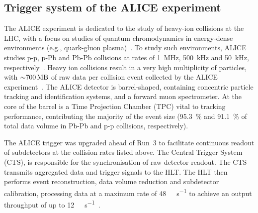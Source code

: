 \subsection{Trigger system of the ALICE experiment}
The ALICE experiment is dedicated to the study of heavy-ion collisions at the LHC, with a focus on studies of quantum chromodynamics in energy-dense environments (e.g.,  quark-gluon plasma)~\cite{alice-performance-paper-run1}. To study such environments, ALICE studies p-p, p-Pb and Pb-Pb collisions at rates of \SI{1}{\mega\hertz}, \SI{500}{\kilo\hertz} and \SI{50}{\kilo\hertz}, respectively~\cite{alice-trigger-run3}. Heavy ion collisions result in a very high multiplicity of particles, with ${\sim}\SI{700}{\mega\byte}$ of raw data per collision event collected by the ALICE experiment~\cite{alice-rta-trigger}. The ALICE detector is barrel-shaped, containing concentric particle tracking and identification systems, and a forward muon spectrometer. At the core of the barrel is a Time Projection Chamber (TPC) vital to tracking performance, contributing the majority of the event size (\SI{95.3}{\percent} and \SI{91.1}{\percent} of total data volume in Pb-Pb and p-p collisions, respectively).

The ALICE trigger was upgraded ahead of Run~3 to facilitate continuous readout of subdetectors at the collision rates listed above. The Central Trigger System (CTS), is responsible for the synchronisation of raw detector readout. The CTS transmits aggregated data and trigger signals to the HLT. The HLT then performs event reconstruction, data volume reduction and subdetector calibration, processing data at a maximum rate of \SI{48}{\giga\byte\per\second} to achieve an output throughput of up to \SI{12}{\giga\byte\per\second}~\cite{alice-rta-trigger}.
